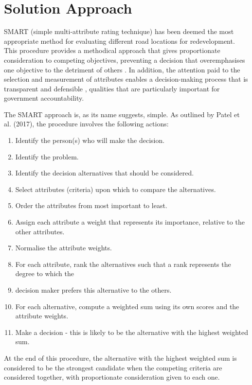 \documentclass[11pt, a4paper]{article}
\begin{document}
    \section{Solution Approach}

    SMART (simple multi-attribute rating technique) has been deemed the most appropriate method for evaluating different road locations for redevelopment. This procedure provides a methodical approach that gives proportionate consideration to competing objectives, preventing a decision that overemphasises one objective to the detriment of others \parencite{a13}. In addition, the attention paid to the selection and measurement of attributes enables a decision-making process that is transparent and defensible \parencite{a13}, qualities that are particularly important for government accountability.

    The SMART approach is, as its name suggests, simple. As outlined by Patel et al. (2017), the procedure involves the following actions:

    \begin{enumerate}
        \item Identify the person(s) who will make the decision.
        \item  Identify the problem.
        \item  Identify the decision alternatives that should be considered.
        \item  Select attributes (criteria) upon which to compare the alternatives.
        \item  Order the attributes from most important to least.
        \item  Assign each attribute a weight that represents its importance, relative to the other attributes.
        \item  Normalise the attribute weights.
        \item  For each attribute, rank the alternatives such that a rank represents the degree to which the \item  decision maker prefers this alternative to the others.
        \item  For each alternative, compute a weighted sum using its own scores and the attribute weights.
        \item  Make a decision - this is likely to be the alternative with the highest weighted sum.
    \end{enumerate}

    At the end of this procedure, the alternative with the highest weighted sum is considered to be the strongest candidate when the competing criteria are considered together, with proportionate consideration given to each one.
\end{document}
